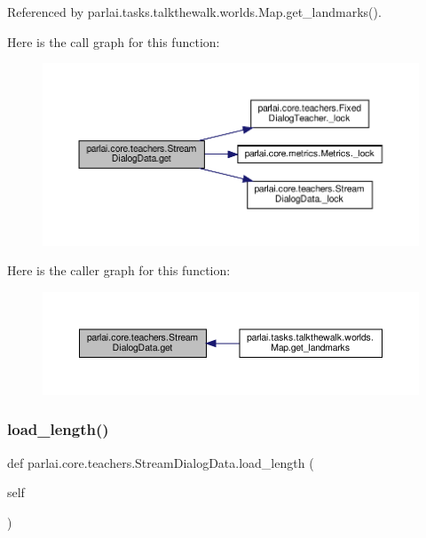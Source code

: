 Referenced by parlai.\+tasks.\+talkthewalk.\+worlds.\+Map.\+get\+\_\+landmarks().

Here is the call graph for this function\+:
\nopagebreak
\begin{figure}[H]
\begin{center}
\leavevmode
\includegraphics[width=350pt]{classparlai_1_1core_1_1teachers_1_1StreamDialogData_a34ba92f60661471fee4eedb5ee2b9eda_cgraph}
\end{center}
\end{figure}
Here is the caller graph for this function\+:
\nopagebreak
\begin{figure}[H]
\begin{center}
\leavevmode
\includegraphics[width=350pt]{classparlai_1_1core_1_1teachers_1_1StreamDialogData_a34ba92f60661471fee4eedb5ee2b9eda_icgraph}
\end{center}
\end{figure}
\mbox{\label{classparlai_1_1core_1_1teachers_1_1StreamDialogData_a5f3e6484038cefcc177a635148f0b492}} 
\subsubsection{\texorpdfstring{load\+\_\+length()}{load\_length()}}
{\footnotesize\ttfamily def parlai.\+core.\+teachers.\+Stream\+Dialog\+Data.\+load\+\_\+length (\begin{DoxyParamCaption}\item[{}]{self }\end{DoxyParamCaption})}


